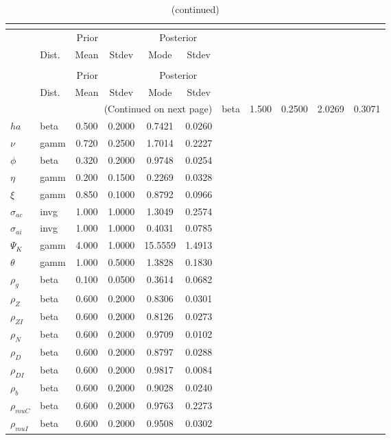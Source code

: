  
\begin{center}
\begin{longtable}{llcccc} 
\caption{Results from posterior maximization (parameters)}\\
 \label{Table:Posterior:1}\\
\toprule 
  & \multicolumn{3}{c}{Prior}  &  \multicolumn{2}{c}{Posterior} \\
  \cmidrule(r{.75em}){2-4} \cmidrule(r{.75em}){5-6}
  & Dist. & Mean  & Stdev & Mode & Stdev \\ 
\midrule \endfirsthead 
\caption{(continued)}\\
 \bottomrule 
  & \multicolumn{3}{c}{Prior}  &  \multicolumn{2}{c}{Posterior} \\
  \cmidrule(r{.75em}){2-4} \cmidrule(r{.75em}){5-6}
  & Dist. & Mean  & Stdev & Mode & Stdev \\ 
\midrule \endhead 
\bottomrule \multicolumn{6}{r}{(Continued on next page)}\endfoot 
\bottomrule\endlastfoot 
${\sigma}$ & beta &   1.500 & 0.2500 &   2.0269 &  0.3071 \\ 
${ha}$ & beta &   0.500 & 0.2000 &   0.7421 &  0.0260 \\ 
$\nu$ & gamm &   0.720 & 0.2500 &   1.7014 &  0.2227 \\ 
${\phi}$ & beta &   0.320 & 0.2000 &   0.9748 &  0.0254 \\ 
${\eta}$ & gamm &   0.200 & 0.1500 &   0.2269 &  0.0328 \\ 
$\xi$ & gamm &   0.850 & 0.1000 &   0.8792 &  0.0966 \\ 
${\sigma_{ac}}$ & invg &   1.000 & 1.0000 &   1.3049 &  0.2574 \\ 
${\sigma_{ai}}$ & invg &   1.000 & 1.0000 &   0.4031 &  0.0785 \\ 
${\Psi_{K}}$ & gamm &   4.000 & 1.0000 &  15.5559 &  1.4913 \\ 
${\theta}$ & gamm &   1.000 & 0.5000 &   1.3828 &  0.1830 \\ 
${\rho_g}$ & beta &   0.100 & 0.0500 &   0.3614 &  0.0682 \\ 
${\rho_Z}$ & beta &   0.600 & 0.2000 &   0.8306 &  0.0301 \\ 
${\rho_{ZI}}$ & beta &   0.600 & 0.2000 &   0.8126 &  0.0273 \\ 
${\rho_N}$ & beta &   0.600 & 0.2000 &   0.9709 &  0.0102 \\ 
${\rho_D}$ & beta &   0.600 & 0.2000 &   0.8797 &  0.0288 \\ 
${\rho_{DI}}$ & beta &   0.600 & 0.2000 &   0.9817 &  0.0084 \\ 
${\rho_b}$ & beta &   0.600 & 0.2000 &   0.9028 &  0.0240 \\ 
${\rho_{muC}}$ & beta &   0.600 & 0.2000 &   0.9763 &  0.2273 \\ 
${\rho_{muI}}$ & beta &   0.600 & 0.2000 &   0.9508 &  0.0302 \\ 
\end{longtable}
 \end{center}
